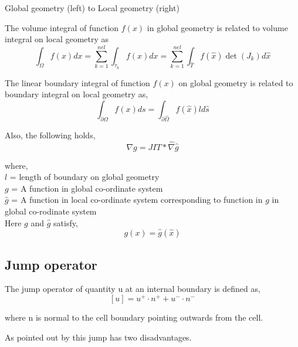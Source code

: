 \documentclass[a4paper,10pt]{book}
\begin{document}
\begin{center}
Global geometry (left) to Local geometry (right)
\end{center}

The volume integral of function $f(x)$ in global geometry is related to volume integral on local geometry as 
\begin{equation}\label{integral_local_global_volume}
\int_\Omega f(x) dx = \sum_{k=1}^{nel} \int_{\tau_k} f(x) dx = \sum_{k=1}^{nel} \int_{\hat{T}} f(\hat{x}) \det(J_k) d \hat{x}
\end{equation}

The linear boundary integral of function $f(x)$ on global geometry is related to boundary integral on local geometry as, 
\begin{equation}\label{integral_local_global_boundary}
\int_{\partial\Omega} f(x) ds = \int_{\partial\hat{\Omega}} f(\hat{x}) l d \hat{s}
\end{equation}

Also, the following holds,
\begin{equation}\label{derivative_transformation}
\nabla g = JIT * \hat{\nabla} \hat{g}
\end{equation}


where, \\

$l$ = length of boundary on global geometry\\
$g$  = A function in global co-ordinate system\\
$\hat{g}$  = A function in local co-ordinate system corresponding to function in $g$ in global co-rodinate system\\

Here $g$ and $\hat{g}$ satisfy,
\begin{equation}\label{func_transformation}
g(x) = \hat{g}(\hat{x})
\end{equation}

\subsection{Jump operator}

The jump operator of quantity u at an internal boundary is defined as,
\begin{equation}\label{jump operator}
[u]=u^+ \cdot n^+ + u^- \cdot n^-
\end{equation}

where n is normal to the cell boundary pointing outwards from the cell.

As pointed out by \cite{Montlaur2} this jump has two disadvantages.
\end{document}
